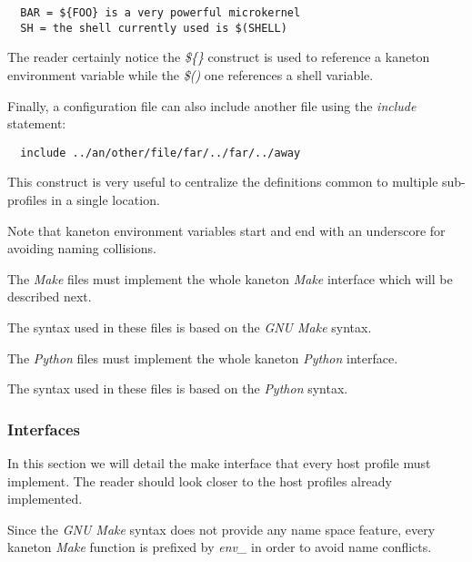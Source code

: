 \begin{verbatim}
  BAR = ${FOO} is a very powerful microkernel
  SH = the shell currently used is $(SHELL)
\end{verbatim}

The reader certainly notice the \textit{\$\{\}} construct is used to reference
a kaneton environment variable while the \textit{\$()} one references a shell
variable.

Finally, a configuration file can also include another file using the
\textit{include} statement:

\begin{verbatim}
  include ../an/other/file/far/../far/../away
\end{verbatim}

This construct is very useful to centralize the definitions common to
multiple sub-profiles in a single location.

Note that kaneton environment variables start and end with an underscore
for avoiding naming collisions.



The \textit{Make} files must implement the whole kaneton \textit{Make}
interface which will be described next.

The syntax used in these files is based on the \textit{GNU Make} syntax.



The \textit{Python} files must implement the whole kaneton \textit{Python}
interface.

The syntax used in these files is based on the \textit{Python} syntax.

%
%

\subsubsection{Interfaces}



In this section we will detail the make interface that every host profile
must implement. The reader should look closer to the host profiles already
implemented.

Since the \textit{GNU Make} syntax does not provide any name space feature,
every kaneton \textit{Make} function is prefixed by \textit{env\_} in order
to avoid name conflicts.

